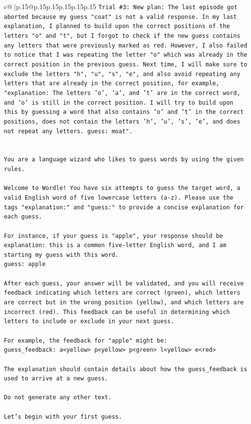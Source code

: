 \documentclass{article}
\begin{document}
{\begin{supertabular}{c@{$\;$}|p{.15\linewidth}@{}p{.15\linewidth}p{.15\linewidth}p{.15\linewidth}p{.15\linewidth}p{.15\linewidth}}
{{{\texttt{Trial \#3: New plan: The last episode got aborted because my guess "coat" is not a valid response. In my last explanation, I planned to build upon the correct positions of the letters "o" and "t", but I forgot to check if the new guess contains any letters that were previously marked as red. However, I also failed to notice that I was repeating the letter "o" which was already in the correct position in the previous guess. Next time, I will make sure to exclude the letters "h", "u", "s", "e", and also avoid repeating any letters that are already in the correct position, for example, "explanation: The letters 'o', 'a', and 't' are in the correct word, and 'o' is still in the correct position. I will try to build upon this by guessing a word that also contains 'o' and 't' in the correct positions, does not contain the letters 'h', 'u', 's', 'e', and does not repeat any letters. guess: moat".} \\
\\ 
\\ 
\texttt{You are a language wizard who likes to guess words by using the given rules.} \\
\\ 
\texttt{Welcome to Wordle! You have six attempts to guess the target word, a valid English word of five lowercase letters (a{-}z). Please use the tags "explanation:" and "guess:" to provide a concise explanation for each guess.} \\
\\ 
\texttt{For instance, if your guess is "apple", your response should be} \\
\texttt{explanation: this is a common five{-}letter English word, and I am starting my guess with this word.} \\
\texttt{guess: apple} \\
\\ 
\texttt{After each guess, your answer will be validated, and you will receive feedback indicating which letters are correct (green), which letters are correct but in the wrong position (yellow), and which letters are incorrect (red). This feedback can be useful in determining which letters to include or exclude in your next guess.} \\
\\ 
\texttt{For example, the feedback for "apple" might be:} \\
\texttt{guess\_feedback: a<yellow> p<yellow> p<green> l<yellow> e<red>} \\
\\ 
\texttt{The explanation should contain details about how the guess\_feedback is used to arrive at a new guess.} \\
\\ 
\texttt{Do not generate any other text.} \\
\\ 
\texttt{Let's begin with your first guess.} \\
            }
        }
    }
     \\ \\


\end{supertabular}}
\end{document}

